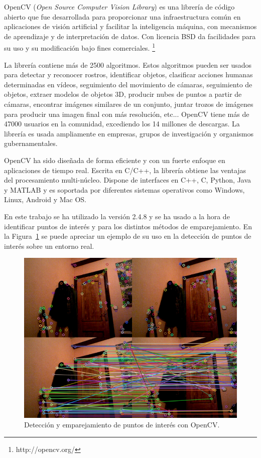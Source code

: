 OpenCV (\textit{Open Source Computer Vision Library}) es una librería de código abierto que fue desarrollada para proporcionar una infraestructura común en aplicaciones de visión artificial y facilitar la inteligencia máquina, con mecanismos de aprendizaje y de interpretación de datos. Con licencia BSD da facilidades para su uso y su modificación bajo fines comerciales. \footnote{http://opencv.org/}

La librería contiene más de 2500 algoritmos. Estos algoritmos pueden ser usados para detectar y reconocer rostros, identificar objetos, clasificar acciones humanas determinadas en vídeos, seguimiento del movimiento de cámaras, seguimiento de objetos, extraer modelos de objetos 3D, producir nubes de puntos a partir de cámaras, encontrar imágenes similares de un conjunto, juntar trozos de imágenes para producir una imagen final con más resolución, etc... OpenCV tiene más de 47000 usuarios en la comunidad, excediendo los 14 millones de descargas. La librería es usada ampliamente en empresas, grupos de investigación y organismos gubernamentales.

OpenCV ha sido diseñada de forma eficiente y con un fuerte enfoque en aplicaciones de tiempo real. Escrita en C/C++, la librería obtiene las ventajas del procesamiento multi-núcleo. Dispone de interfaces en C++, C, Python, Java y MATLAB y es soportada por diferentes sistemas operativos como Windows, Linux, Android y Mac OS.

En este trabajo se ha utilizado la versión 2.4.8 y se ha usado a la hora de identificar puntos de interés y para los distintos métodos de emparejamiento. En la Figura~\ref{fig:SiftDetector2} se puede apreciar un ejemplo de su uso en la detección de puntos de interés sobre un entorno real.

\begin{figure}[th]
\centering
\includegraphics[scale=0.5]{Figures/sift-detector2.png}
\decoRule
\caption[Detección y emparejamiento con OpenCV]{Detección y emparejamiento de puntos de interés con OpenCV.}
\label{fig:SiftDetector2}
\end{figure}

